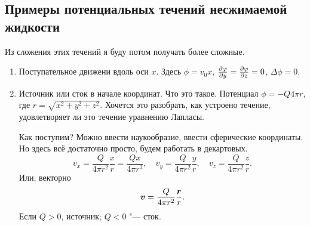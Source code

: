\subsection{Примеры потенциальных течений несжимаемой жидкости}
Из сложения этих течений я буду потом получать более сложные.
\begin{enumerate}
  \item Поступательное движени вдоль оси $x$. Здесь $\phi = v_0 x$, $\frac{\partial \varphi}{\partial y} = \frac{\partial \varphi}{\partial z} = 0$, $\Delta \phi = 0$.
  \item Источник или сток в начале координат. Что это такое. Потенциал $\phi = - Q{4\pi r}$, где $r = \sqrt{x^2+y^2+z^2}$. Хочется это разобрать, как устроено течение, удовлетворяет ли это течение уравнению Лапласы.

Как поступим? Можно ввести наукообразие, ввести сферические координаты. Но здесь всё достаточно просто, будем работать в декартовых.
\[
  v_x = \frac{Q}{4\pi r^2}\frac{x}r = \frac{Qx}{4\pi r^3},\quad v_y = \frac Q{4\pi r^2}\frac yr,\quad v_z = \frac Q{4\pi r^2}\frac zr.
\]
Или, векторно
\[
  \boldsymbol{v} = \frac{Q}{4\pi r^2}\frac{\boldsymbol{r}}{r}.
\]
Если $Q>0$, источник; $Q<0$ "--- сток.
\end{enumerate}
